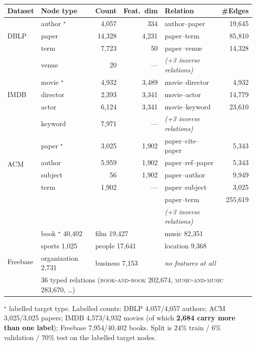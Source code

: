 \begin{table}[htbp]
\centering
\small
\caption{}
\label{p2:tab:hgbdetail}
\begin{tabular}{llrrlr}
\toprule
Dataset & Node type & Count & Feat.\ dim & Relation & \#Edges \\
\midrule
\multirow{3}{*}{DBLP}
 & author $^{\star}$ & 4{,}057  & 334   & author--paper & 19{,}645 \\
 & paper             & 14{,}328 & 4{,}231 & paper--term  & 85{,}810 \\
 & term              & 7{,}723  & 50    & paper--venue  & 14{,}328 \\
 & venue             & 20       & ---   & \emph{(+3 inverse relations)} & \\
\midrule
\multirow{3}{*}{IMDB}
 & movie $^{\star}$  & 4{,}932  & 3{,}489 & movie--director & 4{,}932 \\
 & director          & 2{,}393  & 3{,}341 & movie--actor    & 14{,}779 \\
 & actor             & 6{,}124  & 3{,}341 & movie--keyword  & 23{,}610 \\
 & keyword           & 7{,}971  & ---   & \emph{(+3 inverse relations)} & \\
\midrule
\multirow{4}{*}{ACM}
 & paper $^{\star}$  & 3{,}025  & 1{,}902 & paper--cite--paper & 5{,}343 \\
 & author            & 5{,}959  & 1{,}902 & paper--ref--paper  & 5{,}343 \\
 & subject           & 56       & 1{,}902 & paper--author      & 9{,}949 \\
 & term              & 1{,}902  & ---   & paper--subject     & 3{,}025 \\
 &                   &          &       & paper--term        & 255{,}619 \\
 &                   &          &       & \emph{(+3 inverse relations)} & \\
\midrule
\multirow{4}{*}{Freebase}
 & book $^{\star}$ 40{,}402 & \multicolumn{2}{l}{film 19{,}427} & \multicolumn{2}{l}{music 82{,}351} \\
 & sports 1{,}025 & \multicolumn{2}{l}{people 17{,}641} & \multicolumn{2}{l}{location 9{,}368} \\
 & organization 2{,}731 & \multicolumn{2}{l}{business 7{,}153} & \multicolumn{2}{l}{\emph{no features at all}} \\
 & \multicolumn{5}{l}{36 typed relations (\textsc{book-and-book} 202{,}674,
   \textsc{music-and-music} 283{,}670, \dots)} \\
\bottomrule
\end{tabular}

\vspace{2pt}
{\footnotesize $^{\star}$ labelled target type. Labelled counts: DBLP 4{,}057/4{,}057 authors;
ACM 3{,}025/3{,}025 papers; IMDB 4{,}573/4{,}932 movies (of which \textbf{2{,}684 carry more than
one label}); Freebase 7{,}954/40{,}402 books. Split is $24\%$ train / $6\%$ validation / $70\%$
test on the labelled target nodes.}
\end{table}

